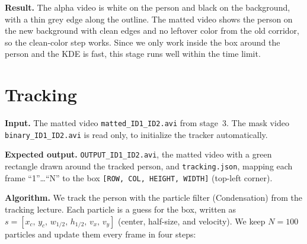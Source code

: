 \documentclass[11pt]{article}
\begin{document}

\medskip
\noindent
\textbf{Result.} The alpha video is white on the person and black on the background, with a thin grey
edge along the outline. The matted video shows the person on the new background with clean edges and
no leftover color from the old corridor, so the clean-color step works. Since we only work inside the
box around the person and the KDE is fast, this stage runs well within the time limit.


\section{Tracking}

\noindent
\begin{sloppypar}
\textbf{Input.} The matted video \texttt{matted\_ID1\_ID2.avi} from stage~3. The mask video
\texttt{binary\_ID1\_ID2.avi} is read only, to initialize the tracker automatically.
\end{sloppypar}

\medskip
\noindent
\textbf{Expected output.} \texttt{OUTPUT\_ID1\_ID2.avi}, the matted video with a green rectangle
drawn around the tracked person, and \texttt{tracking.json}, mapping each frame ``1''\dots``N'' to
the box \texttt{[ROW, COL, HEIGHT, WIDTH]} (top-left corner).

\medskip
\noindent
\textbf{Algorithm.} We track the person with the particle filter (Condensation) from the tracking
lecture. Each particle is a guess for the box, written as
$s=[x_c,\, y_c,\, w_{1/2},\, h_{1/2},\, v_x,\, v_y]$ (center, half-size, and velocity). We keep
$N=100$ particles and update them every frame in four steps:
\end{document}
